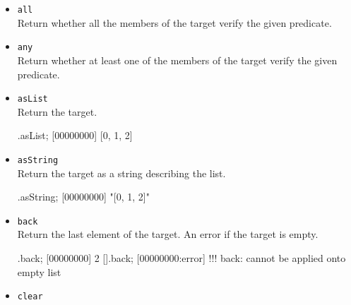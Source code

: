 \begin{itemize}
\item \lstinline|all|\\
Return whether all the members of the target verify the given
predicate.


\item \lstinline|any|\\
Return whether at least one of the members of the target verify the
given predicate.


\item \lstinline|asList|\\
Return the target.

\begin{urbiscript}[firstnumber=last]
[0, 1, 2].asList;
[00000000] [0, 1, 2]
\end{urbiscript}

\item \lstinline|asString|\\
Return the target as a string describing the list.

\begin{urbiscript}[firstnumber=last]
[0, 1, 2].asString;
[00000000] "[0, 1, 2]"
\end{urbiscript}

\item \lstinline|back|\\
Return the last element of the target. An error if the target is empty.

\begin{urbiscript}[firstnumber=last]
[0, 1, 2].back;
[00000000] 2
[].back;
[00000000:error] !!! back: cannot be applied onto empty list
\end{urbiscript}

\item \lstinline|clear|\\


\end{itemize}
